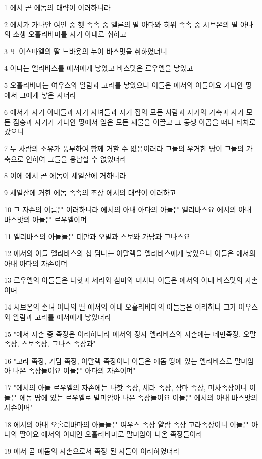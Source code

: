 \par 1 에서 곧 에돔의 대략이 이러하니라
\par 2 에서가 가나안 여인 중 헷 족속 중 엘론의 딸 아다와 히위 족속 중 시브온의 딸 아나의 소생 오홀리바마를 자기 아내로 취하고
\par 3 또 이스마엘의 딸 느바욧의 누이 바스맛을 취하였더니
\par 4 아다는 엘리바스를 에서에게 낳았고 바스맛은 르우엘을 낳았고
\par 5 오홀리바마는 여우스와 얄람과 고라를 낳았으니 이들은 에서의 아들이요 가나안 땅에서 그에게 낳은 자더라
\par 6 에서가 자기 아내들과 자기 자녀들과 자기 집의 모든 사람과 자기의 가축과 자기 모든 짐승과 자기가 가나안 땅에서 얻은 모든 재물을 이끌고 그 동생 야곱을 떠나 타처로 갔으니
\par 7 두 사람의 소유가 풍부하여 함께 거할 수 없음이러라 그들의 우거한 땅이 그들의 가축으로 인하여 그들을 용납할 수 없었더라
\par 8 이에 에서 곧 에돔이 세일산에 거하니라
\par 9 세일산에 거한 에돔 족속의 조상 에서의 대략이 이러하고
\par 10 그 자손의 이름은 이러하니라 에서의 아내 아다의 아들은 엘리바스요 에서의 아내 바스맛의 아들은 르우엘이며
\par 11 엘리바스의 아들들은 데만과 오말과 스보와 가담과 그나스요
\par 12 에서의 아들 엘리바스의 첩 딤나는 아말렉을 엘리바스에게 낳았으니 이들은 에서의 아내 아다의 자손이며
\par 13 르우엘의 아들들은 나핫과 세라와 삼마와 미사니 이들은 에서의 아내 바스맛의 자손이며
\par 14 시브온의 손녀 아나의 딸 에서의 아내 오홀리바마의 아들들은 이러하니 그가 여우스와 얄람과 고라를 에서에게 낳았더라
\par 15 "에서 자손 중 족장은 이러하니라 에서의 장자 엘리바스의 자손에는 데만족장, 오말 족장, 스보족장, 그나스 족장과"
\par 16 "고라 족장, 가담 족장, 아말렉 족장이니 이들은 에돔 땅에 있는 엘리바스로 말미암아 나온 족장들이요 이들은 아다의 자손이며"
\par 17 "에서의 아들 르우엘의 자손에는 나핫 족장, 세라 족장, 삼마 족장, 미사족장이니 이들은 에돔 땅에 있는 르우엘로 말미암아 나온 족장들이요 이들은 에서의 아내 바스맛의 자손이며"
\par 18 에서의 아내 오홀리바마의 아들들은 여우스 족장 얄람 족장 고라족장이니 이들은 아나의 딸이요 에서의 아내인 오홀리바마로 말미암아 나온 족장들이라
\par 19 에서 곧 에돔의 자손으로서 족장 된 자들이 이러하였더라
